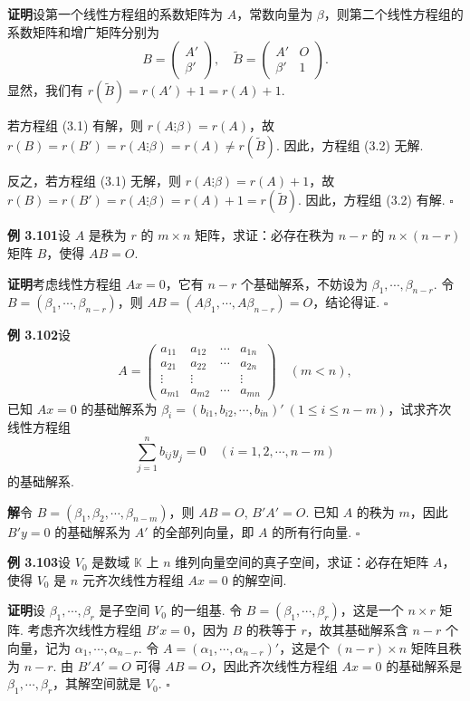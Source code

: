 \documentclass[UTF8,12pt,a4paper,fontset=fandol]{ctexart}
\begin{document}
\noindent\textbf{证明}\quad 设第一个线性方程组的系数矩阵为 $A$，常数向量为 $\beta$，则第二个线性方程组的系数矩阵和增广矩阵分别为
\[
B=\begin{pmatrix}A'\\\beta'\end{pmatrix},\quad
\widetilde{B}=\begin{pmatrix}A'&O\\\beta'&1\end{pmatrix}.
\]
显然，我们有 $r(\widetilde{B})=r(A')+1=r(A)+1$.

若方程组 (3.1) 有解，则 $r(A\vdots\beta)=r(A)$，故 $r(B)=r(B')=r(A\vdots\beta)=r(A)\ne r(\widetilde{B})$. 因此，方程组 (3.2) 无解.

反之，若方程组 (3.1) 无解，则 $r(A\vdots\beta)=r(A)+1$，故 $r(B)=r(B')=r(A\vdots\beta)=r(A)+1=r(\widetilde{B})$. 因此，方程组 (3.2) 有解. $\square$

\noindent\textbf{例 3.101}\quad 设 $A$ 是秩为 $r$ 的 $m\times n$ 矩阵，求证：必存在秩为 $n-r$ 的 $n\times(n-r)$ 矩阵 $B$，使得 $AB=O$.

\noindent\textbf{证明}\quad 考虑线性方程组 $Ax=0$，它有 $n-r$ 个基础解系，不妨设为 $\beta_1,\cdots,\beta_{n-r}$. 令 $B=(\beta_1,\cdots,\beta_{n-r})$，则 $AB=(A\beta_1,\cdots,A\beta_{n-r})=O$，结论得证. $\square$

\noindent\textbf{例 3.102}\quad 设
\[
A=\begin{pmatrix}
a_{11}&a_{12}&\cdots&a_{1n}\\
a_{21}&a_{22}&\cdots&a_{2n}\\
\vdots&\vdots&&\vdots\\
a_{m1}&a_{m2}&\cdots&a_{mn}
\end{pmatrix}\quad (m<n),
\]
已知 $Ax=0$ 的基础解系为 $\beta_i=(b_{i1},b_{i2},\cdots,b_{in})'\ (1\le i\le n-m)$，试求齐次线性方程组
\[
\sum_{j=1}^n b_{ij}y_j=0\quad (i=1,2,\cdots,n-m)
\]
的基础解系.

\noindent\textbf{解}\quad 令 $B=(\beta_1,\beta_2,\cdots,\beta_{n-m})$，则 $AB=O$, $B'A'=O$. 已知 $A$ 的秩为 $m$，因此 $B'y=0$ 的基础解系为 $A'$ 的全部列向量，即 $A$ 的所有行向量. $\square$

\noindent\textbf{例 3.103}\quad 设 $V_0$ 是数域 $\mathbb{K}$ 上 $n$ 维列向量空间的真子空间，求证：必存在矩阵 $A$，使得 $V_0$ 是 $n$ 元齐次线性方程组 $Ax=0$ 的解空间.

\noindent\textbf{证明}\quad 设 $\beta_1,\cdots,\beta_r$ 是子空间 $V_0$ 的一组基. 令 $B=(\beta_1,\cdots,\beta_r)$，这是一个 $n\times r$ 矩阵. 考虑齐次线性方程组 $B'x=0$，因为 $B$ 的秩等于 $r$，故其基础解系含 $n-r$ 个向量，记为 $\alpha_1,\cdots,\alpha_{n-r}$. 令 $A=(\alpha_1,\cdots,\alpha_{n-r})'$，这是个 $(n-r)\times n$ 矩阵且秩为 $n-r$. 由 $B'A'=O$ 可得 $AB=O$，因此齐次线性方程组 $Ax=0$ 的基础解系是 $\beta_1,\cdots,\beta_r$，其解空间就是 $V_0$. $\square$
\end{document}
